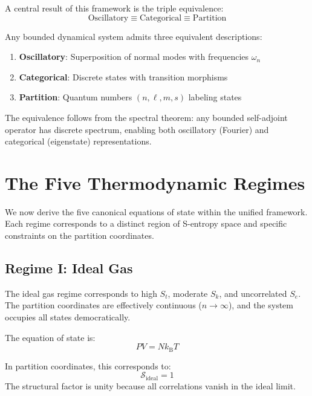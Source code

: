 \documentclass[twocolumn,aps,prd,superscriptaddress,nofootinbib]{revtex4-2}
\newcommand{\Sk}{S_k}
\newcommand{\St}{S_t}
\newcommand{\Se}{S_e}
\newcommand{\kB}{k_{\mathrm{B}}}
\begin{document}
A central result of this framework is the triple equivalence:
\begin{equation}
\boxed{\text{Oscillatory} \equiv \text{Categorical} \equiv \text{Partition}}
\end{equation}

Any bounded dynamical system admits three equivalent descriptions:
\begin{enumerate}
    \item \textbf{Oscillatory}: Superposition of normal modes with frequencies $\omega_n$
    \item \textbf{Categorical}: Discrete states with transition morphisms
    \item \textbf{Partition}: Quantum numbers $(n, \ell, m, s)$ labeling states
\end{enumerate}

The equivalence follows from the spectral theorem: any bounded self-adjoint operator has discrete spectrum, enabling both oscillatory (Fourier) and categorical (eigenstate) representations.

\section{The Five Thermodynamic Regimes}
\label{sec:regimes}

We now derive the five canonical equations of state within the unified framework. Each regime corresponds to a distinct region of S-entropy space and specific constraints on the partition coordinates.

\subsection{Regime I: Ideal Gas}

The ideal gas regime corresponds to high $\St$, moderate $\Sk$, and uncorrelated $\Se$. The partition coordinates are effectively continuous ($n \to \infty$), and the system occupies all states democratically.

The equation of state is:
\begin{equation}
PV = N\kB T
\end{equation}

In partition coordinates, this corresponds to:
\begin{equation}
\mathcal{S}_{\text{ideal}} = 1
\end{equation}
The structural factor is unity because all correlations vanish in the ideal limit.
\end{document}
